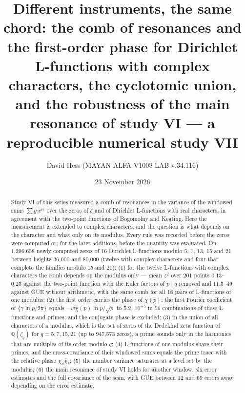\documentclass[
  10pt,
]{article}
\title{Different instruments, the same chord: the comb of resonances and
the first-order phase for Dirichlet L-functions with complex characters,
the cyclotomic union, and the robustness of the main resonance of study
VI --- a reproducible numerical study VII}
\author{David Hess (MAYAN ALFA V1008 LAB v.34.116)}
\date{23 November 2026}
\begin{document}
\maketitle
\begin{abstract}
Study VI of this series measured a comb of resonances in the variance of
the windowed sums \(\sum g\,x^{i\gamma}\) over the zeros of \(\zeta\)
and of Dirichlet L-functions with real characters, in agreement with the
two-point functions of Bogomolny and Keating. Here the measurement is
extended to complex characters, and the question is what depends on the
character and what only on its modulus. Every rule was recorded before
the zeros were computed or, for the later additions, before the quantity
was evaluated. On 1,296,658 newly computed zeros of 16 Dirichlet
L-functions modulo 5, 7, 13, 15 and 21 between heights 36,000 and 80,000
(twelve with complex characters and four that complete the families
modulo 15 and 21): (1) for the twelve L-functions with complex
characters the comb depends on the modulus only --- mean \(z^2\) over
201 points 0.13--0.25 against the two-point function with the Euler
factors of \(p \mid q\) removed and 11.5--49 against GUE without
arithmetic, with the same comb for all 18 pairs of L-functions of one
modulus; (2) the first order carries the phase of \(\chi(p)\): the first
Fourier coefficient of \(\{\gamma\ln p/2\pi\}\) equals
\(-w\chi(p)\ln p/\sqrt p\) to \(5.2\cdot10^{-5}\) in 56 combinations of
these L-functions and primes, and the conjugate phase is excluded; (3)
in the union of all characters of a modulus, which is the set of zeros
of the Dedekind zeta function of \(\mathbb{Q}(\zeta_q)\) for
\(q = 5, 7, 15, 21\) (up to 947,573 zeros), a prime sounds only in the
harmonics that are multiples of its order modulo \(q\); (4) L-functions
of one modulus share their primes, and the cross-covariance of their
windowed sums equals the prime trace with the relative phase
\(\chi_a\bar\chi_b\); (5) the number variance saturates at a level set
by the modulus; (6) the main resonance of study VI holds for another
window, six error estimates and the full covariance of the scan, with
GUE between 12 and 69 errors away depending on the error estimate.


\end{abstract}
\end{document}
